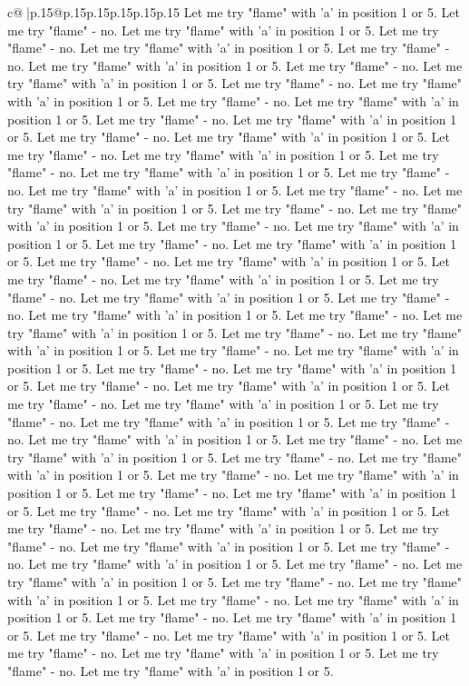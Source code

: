 \documentclass{article}
\begin{document}
{\begin{supertabular}{c@{$\;$}|p{.15\linewidth}@{}p{.15\linewidth}p{.15\linewidth}p{.15\linewidth}p{.15\linewidth}p{.15\linewidth}}
{{{Let me try "flame" with 'a' in position 1 or 5. Let me try "flame" {-} no. Let me try "flame" with 'a' in position 1 or 5. Let me try "flame" {-} no. Let me try "flame" with 'a' in position 1 or 5. Let me try "flame" {-} no. Let me try "flame" with 'a' in position 1 or 5. Let me try "flame" {-} no. Let me try "flame" with 'a' in position 1 or 5. Let me try "flame" {-} no. Let me try "flame" with 'a' in position 1 or 5. Let me try "flame" {-} no. Let me try "flame" with 'a' in position 1 or 5. Let me try "flame" {-} no. Let me try "flame" with 'a' in position 1 or 5. Let me try "flame" {-} no. Let me try "flame" with 'a' in position 1 or 5. Let me try "flame" {-} no. Let me try "flame" with 'a' in position 1 or 5. Let me try "flame" {-} no. Let me try "flame" with 'a' in position 1 or 5. Let me try "flame" {-} no. Let me try "flame" with 'a' in position 1 or 5. Let me try "flame" {-} no. Let me try "flame" with 'a' in position 1 or 5. Let me try "flame" {-} no. Let me try "flame" with 'a' in position 1 or 5. Let me try "flame" {-} no. Let me try "flame" with 'a' in position 1 or 5. Let me try "flame" {-} no. Let me try "flame" with 'a' in position 1 or 5. Let me try "flame" {-} no. Let me try "flame" with 'a' in position 1 or 5. Let me try "flame" {-} no. Let me try "flame" with 'a' in position 1 or 5. Let me try "flame" {-} no. Let me try "flame" with 'a' in position 1 or 5. Let me try "flame" {-} no. Let me try "flame" with 'a' in position 1 or 5. Let me try "flame" {-} no. Let me try "flame" with 'a' in position 1 or 5. Let me try "flame" {-} no. Let me try "flame" with 'a' in position 1 or 5. Let me try "flame" {-} no. Let me try "flame" with 'a' in position 1 or 5. Let me try "flame" {-} no. Let me try "flame" with 'a' in position 1 or 5. Let me try "flame" {-} no. Let me try "flame" with 'a' in position 1 or 5. Let me try "flame" {-} no. Let me try "flame" with 'a' in position 1 or 5. Let me try "flame" {-} no. Let me try "flame" with 'a' in position 1 or 5. Let me try "flame" {-} no. Let me try "flame" with 'a' in position 1 or 5. Let me try "flame" {-} no. Let me try "flame" with 'a' in position 1 or 5. Let me try "flame" {-} no. Let me try "flame" with 'a' in position 1 or 5. Let me try "flame" {-} no. Let me try "flame" with 'a' in position 1 or 5. Let me try "flame" {-} no. Let me try "flame" with 'a' in position 1 or 5. Let me try "flame" {-} no. Let me try "flame" with 'a' in position 1 or 5. Let me try "flame" {-} no. Let me try "flame" with 'a' in position 1 or 5. Let me try "flame" {-} no. Let me try "flame" with 'a' in position 1 or 5. Let me try "flame" {-} no. Let me try "flame" with 'a' in position 1 or 5. Let me try "flame" {-} no. Let me try "flame" with 'a' in position 1 or 5. Let me try "flame" {-} no. Let me try "flame" with 'a' in position 1 or 5. Let me try "flame" {-} no. Let me try "flame" with 'a' in position 1 or 5. Let me try "flame" {-} no. Let me try "flame" with 'a' in position 1 or 5. Let me try "flame" {-} no. Let me try "flame" with 'a' in position 1 or 5. Let me try "flame" {-} no. Let me try "flame" with 'a' in position 1 or 5. Let me try "flame" {-} no. Let me try "flame" with 'a' in position 1 or 5. }}}
\end{supertabular}}
\end{document}
